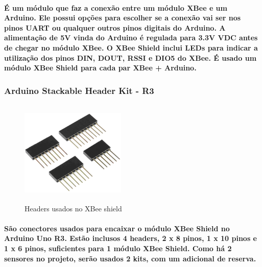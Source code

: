 \paragraph{
É um módulo que faz a conexão entre um módulo XBee e um Arduino. Ele possui opções para escolher se a conexão vai ser nos pinos UART ou qualquer outros pinos digitais do Arduino. A alimentação de 5V vinda do Arduino é regulada para 3.3V VDC antes de chegar no módulo XBee. O XBee Shield inclui LEDs para indicar a utilização dos pinos DIN, DOUT, RSSI e DIO5 do XBee. É usado um módulo XBee Shield para cada par XBee + Arduino.
}

\subsubsection{Arduino Stackable Header Kit - R3}
\begin{figure}[H]
\begin{center}
\includegraphics[width=5cm,height=5cm,keepaspectratio]{figuras/headers.png}
\caption{\label{fig:xbee shield headers} Headers usados no XBee shield}
\end{center}
\end{figure}
\paragraph{
São conectores usados para encaixar o módulo XBee Shield no Arduino Uno R3. Estão inclusos 4 headers, 2 x 8 pinos, 1 x 10 pinos e 1 x 6 pinos, suficientes para 1 módulo XBee Shield. Como há 2 sensores no projeto, serão usados 2 kits, com um adicional de reserva.
}

